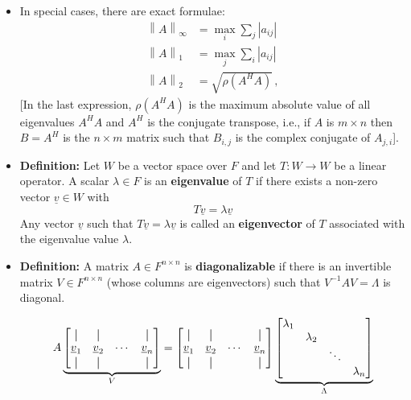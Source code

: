 \documentclass[11pt,twoside]{report}
\newcommand{\vecnot}{\underline}
\begin{document}
\begin{itemize}
\item  In special cases, there are exact formulae:
\begin{align*}
\left\| A \right\|_{\infty} &=
\max_{i} \sum_{j} |a_{ij}| \\
\left\| A \right\|_{1} &= 
\max_{j} \sum_{i} |a_{ij}| \\
\left\| A \right\|_{2} &= 
\sqrt{\rho (A^H A)} \, ,
\end{align*}
[In the last expression,  $\rho(A^HA)$ is the maximum absolute value of  all eigenvalues $A^H A$  and $A^H$ is the conjugate transpose, i.e., if $A$ is $m \times n$ then $B = A^H$ is the $n \times m$ matrix such that $B_{i,j}$ is the complex conjugate of $A_{j,i}$]. 


\item \textbf{Definition:} Let $W$ be a vector space over $F$ and let $T\colon W \to W$ be a linear operator.
A scalar $\lambda \in F$ is an \textbf{eigenvalue} of $T$ if there exists a non-zero vector $\vecnot{v} \in W$ with 
\[
T \vecnot{v} = \lambda \vecnot{v}
\]
Any vector $\vecnot{v}$ such that  $T \vecnot{v} = \lambda \vecnot{v}$  is called an \textbf{eigenvector} of $T$ associated with the eigenvalue value $\lambda$.


\item  \textbf{Definition:}
A matrix $A \in F^{n \times n}$ is \textbf{diagonalizable} if there is an invertible matrix $V \in F^{n \times n}$ (whose columns are eigenvectors) such that $V^{-1} A V = \Lambda$ is diagonal.
\newcommand*{\vertbar}{\rule[-1ex]{0.5pt}{2.5ex}}

\[ A \underbrace{\begin{bmatrix} \vertbar & \vertbar & & \vertbar \\ \vecnot{v}_1 & \vecnot{v}_2 & \cdots & \vecnot{v}_n \\ \vertbar & \vertbar & & \vertbar \end{bmatrix}}_{V} = \begin{bmatrix} \vertbar & \vertbar & & \vertbar \\ \vecnot{v}_1 & \vecnot{v}_2 & \cdots & \vecnot{v}_n \\ \vertbar & \vertbar & & \vertbar \end{bmatrix} \underbrace{\begin{bmatrix} \lambda_1 & & & \\ & \lambda_2 & & \\ & & \ddots & \\ & & & \lambda_n \end{bmatrix}}_{\Lambda} \]



\end{itemize}
\end{document}
